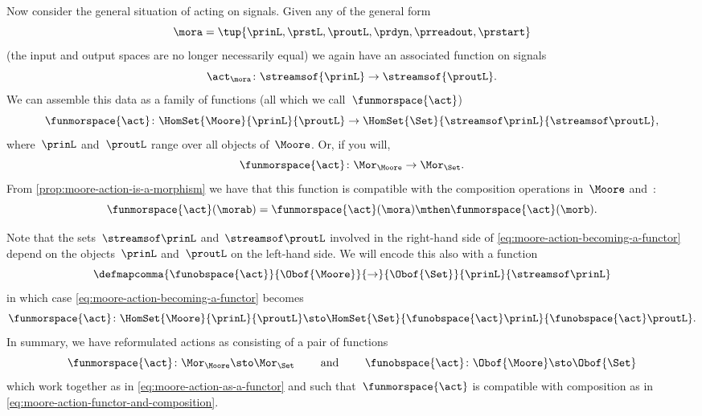 {Now consider the general situation of  acting on signals.
Given any  of the general form
\begin{equation}
    \mora = \tup{\prinL,\prstL,\proutL,\prdyn,\prreadout,\prstart}
\end{equation}
(the input and output spaces are no longer necessarily equal) we again have an associated function on signals
\begin{equation}
    \act_{\mora} \colon \streamsof{\prinL} \to \streamsof {\proutL}.
\end{equation}
We can assemble this data as a family of functions (all which we call~$\funmorspace{\act}$)
\begin{equation}
    \label{eq:moore-action-becoming-a-functor}
    \funmorspace{\act} \colon \HomSet{\Moore}{\prinL}{\proutL} \to \HomSet{\Set}{\streamsof\prinL}{\streamsof\proutL},
\end{equation}
where~$\prinL$ and~$\proutL$ range over all objects of~$\Moore$.
Or, if you will,
\begin{equation}
    \funmorspace{\act} \colon \Mor_\Moore \to \Mor_\Set.
\end{equation}
From \cref{prop:moore-action-is-a-morphism} we have that this function is compatible with the composition operations in~$\Moore$ and~\Set:
\begin{equation}
    \label{eq:moore-action-functor-and-composition}
    \funmorspace{\act}(\morab) = \funmorspace{\act}(\mora) \mthen \funmorspace{\act}(\morb).
\end{equation}

Note that the sets~$\streamsof\prinL$ and~$\streamsof\proutL$ involved in the right-hand side of \cref{eq:moore-action-becoming-a-functor} depend on the objects~$\prinL$ and~$\proutL$ on the left-hand side.
We will encode this also with a function
\begin{equation}
    \defmapcomma{\funobspace{\act}}
    {\Obof{\Moore}}
    {\to}
    {\Obof{\Set}}
    {\prinL}
    {\streamsof\prinL}
\end{equation}
in which case \cref{eq:moore-action-becoming-a-functor} becomes
\begin{equation}
    \label{eq:moore-action-as-a-functor}
    \funmorspace{\act} \colon \HomSet{\Moore}{\prinL}{\proutL} \sto \HomSet{\Set}{ \funobspace{\act}\prinL}{\funobspace{\act}\proutL}.
\end{equation}
%
In summary, we have reformulated  actions as consisting of a pair of functions
\begin{equation}
    \funmorspace{\act} \colon \Mor_\Moore \sto \Mor_\Set \qquad \text{ and } \qquad \funobspace{\act} \colon \Obof{\Moore} \sto \Obof{\Set}
\end{equation}
which work together as in \cref{eq:moore-action-as-a-functor} and such that~$\funmorspace{\act}$ is compatible with composition as in \cref{eq:moore-action-functor-and-composition}.

}
